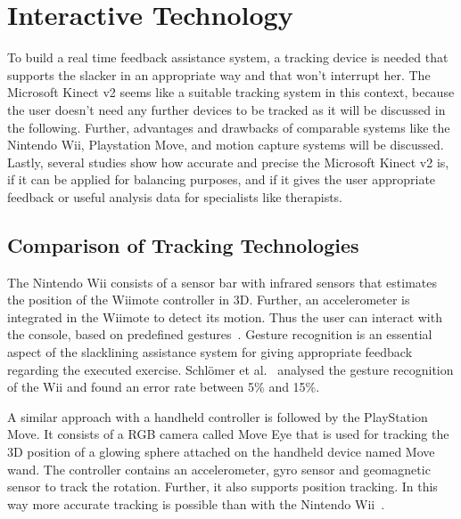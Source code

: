 \section{Interactive Technology}\label{2_3_interactiveTechnology}

To build a real time feedback assistance system, a tracking device is needed that supports the slacker in an appropriate way and that won't interrupt her.
The Microsoft Kinect v2 seems like a suitable tracking system in this context, because the user doesn't need any further devices to be tracked as it will be discussed in the following.
Further, advantages and drawbacks of comparable systems like the Nintendo Wii, Playstation Move, and motion capture systems will be discussed.
Lastly, several studies show how accurate and precise the Microsoft Kinect v2 is, if it can be applied for balancing purposes, and if it gives the user appropriate feedback or useful analysis data for specialists like therapists.

\subsection{Comparison of Tracking Technologies} \label{trackingTechnologie}

The Nintendo Wii consists of a sensor bar with infrared sensors that estimates the position of the Wiimote controller in 3D. Further, an accelerometer is integrated in the Wiimote to detect its motion. Thus the user can interact with the console, based on predefined gestures~\cite{Bogdanovych2015-ci, Tanaka2012-ACO}. Gesture recognition is an essential aspect of the slacklining assistance system for giving appropriate feedback regarding the executed exercise. Schlömer et al.~\cite{Schlomer2008-uo} analysed the gesture recognition of the Wii and found an error rate between 5\% and 15\%.

A similar approach with a handheld controller is followed by the PlayStation Move. It consists of a RGB camera called Move Eye that is used for tracking the 3D position of a glowing sphere attached on the handheld device named Move wand. The controller contains an accelerometer, gyro sensor and geomagnetic sensor to track the rotation. Further, it also supports position tracking. In this way more accurate tracking is possible than with the Nintendo Wii~\cite{Bogdanovych2015-ci, Tanaka2012-ACO}.

